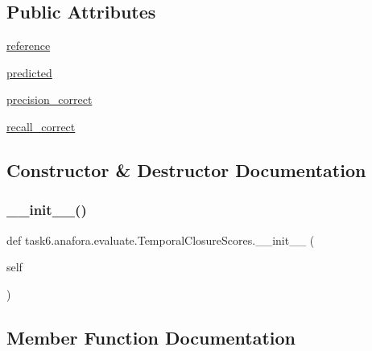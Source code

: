 \subsection*{Public Attributes}
\begin{DoxyCompactItemize}
\item 
\hyperlink{classtask6_1_1anafora_1_1evaluate_1_1TemporalClosureScores_a8192811ddbab1e7abaab6e0f2505c331}{reference}
\item 
\hyperlink{classtask6_1_1anafora_1_1evaluate_1_1TemporalClosureScores_a3bef24daaf47a04551bed9a53c4177c3}{predicted}
\item 
\hyperlink{classtask6_1_1anafora_1_1evaluate_1_1TemporalClosureScores_a97f41731b8e558e2495f33d54301cf2c}{precision\+\_\+correct}
\item 
\hyperlink{classtask6_1_1anafora_1_1evaluate_1_1TemporalClosureScores_a0e38c4098a7a2e383a51529c0c975ffb}{recall\+\_\+correct}
\end{DoxyCompactItemize}


\subsection{Constructor \& Destructor Documentation}
\mbox{\label{classtask6_1_1anafora_1_1evaluate_1_1TemporalClosureScores_a4327a6108863bdd09878d965f73c3cad}} 
\subsubsection{\texorpdfstring{\+\_\+\+\_\+init\+\_\+\+\_\+()}{\_\_init\_\_()}}
{\footnotesize\ttfamily def task6.\+anafora.\+evaluate.\+Temporal\+Closure\+Scores.\+\_\+\+\_\+init\+\_\+\+\_\+ (\begin{DoxyParamCaption}\item[{}]{self }\end{DoxyParamCaption})}



\subsection{Member Function Documentation}
\mbox{\label{classtask6_1_1anafora_1_1evaluate_1_1TemporalClosureScores_a7b38fd0d0f5b5d3a8905285d1ca6465e}} 
